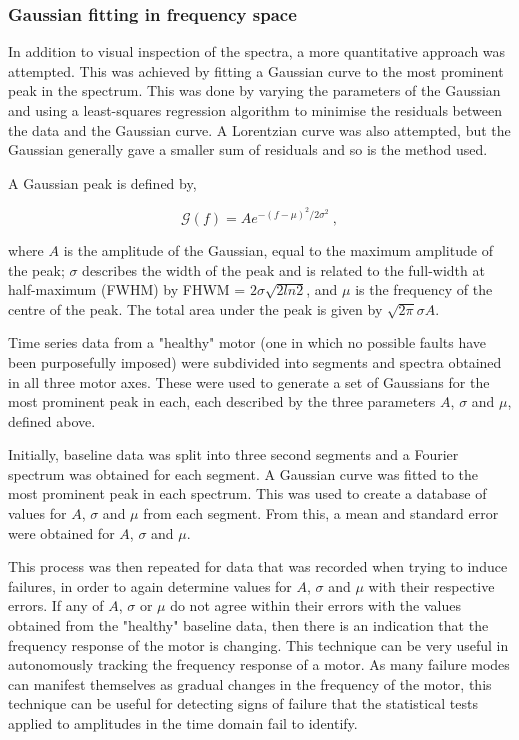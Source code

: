 \subsubsection{Gaussian fitting in frequency space}

In addition to visual inspection of the spectra, a more quantitative approach was attempted. This was achieved by fitting a Gaussian curve to the most prominent peak in the spectrum. This was done by varying the parameters of the Gaussian and using a least-squares regression algorithm to minimise the residuals between the data and the Gaussian curve. A Lorentzian curve was also attempted, but the Gaussian generally gave a smaller sum of residuals and so is the method used. 

A Gaussian peak is defined by,

\begin{equation}
   \mathcal{G}(f) = A e^{-(f-\mu)^2/2\sigma^2}~,
    \label{eq:gaussian}
\end{equation}

where $A$ is the amplitude of the Gaussian, equal to the maximum amplitude of the peak; $\sigma$ describes the width of the peak and is related to the full-width at half-maximum (FWHM) by FHWM = $2\sigma \sqrt{2ln2}$, and $\mu$ is the frequency of the centre of the peak. The total area under the peak is given by $\sqrt{2\pi}\sigma A$.

Time series data from a "healthy" motor (one in which no possible faults have been purposefully imposed) were subdivided into segments and spectra obtained in all three motor axes. These were used to generate a set of Gaussians for the most prominent peak in each, each described by the three parameters $A$, $\sigma$ and $\mu$, defined above.

Initially, baseline data was split into three second segments and a Fourier spectrum was obtained for each segment. A Gaussian curve was fitted to the most prominent peak in each spectrum. This was used to create a database of values for $A$, $\sigma$ and $\mu$ from each segment. From this, a mean and standard error were obtained for $A$, $\sigma$ and $\mu$. 

This process was then repeated for data that was recorded when trying to induce failures, in order to again determine values for $A$, $\sigma$ and $\mu$ with their respective errors. If any of $A$, $\sigma$ or $\mu$ do not agree within their errors with the values obtained from the "healthy" baseline data, then there is an indication that the frequency response of the motor is changing. This technique can be very useful in autonomously tracking the frequency response of a motor. As many failure modes can manifest themselves as gradual changes in the frequency of the motor, this technique can be useful for detecting signs of failure that the statistical tests applied to amplitudes in the time domain fail to identify. 
 
